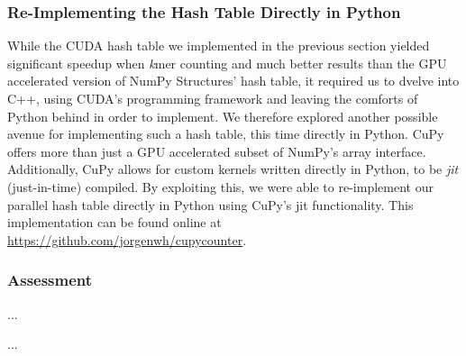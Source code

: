 \subsubsection{Re-Implementing the Hash Table Directly in Python}
While the CUDA hash table we implemented in the previous section yielded significant speedup when \textit{k}mer counting and much better results than the GPU accelerated version of NumPy Structures' hash table, it required us to dvelve into C++, using CUDA's programming framework and leaving the comforts of Python behind in order to implement.
We therefore explored another possible avenue for implementing such a hash table, this time directly in Python.
CuPy offers more than just a GPU accelerated subset of NumPy's array interface.
Additionally, CuPy allows for custom kernels written directly in Python, to be \textit{jit} (just-in-time) compiled.
By exploiting this, we were able to re-implement our parallel hash table directly in Python using CuPy's jit functionality.
This implementation can be found online at \url{https://github.com/jorgenwh/cupycounter}.

\subsubsection{Assessment}
...

...
